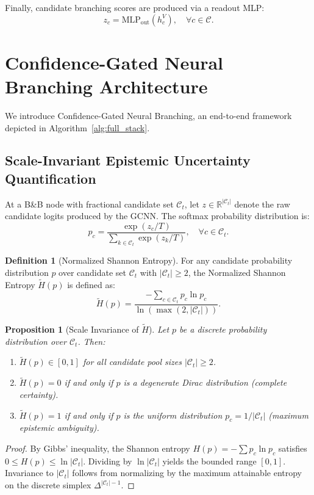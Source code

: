 \documentclass[10pt,twocolumn,letterpaper]{article}
\theoremstyle{plain}
\newtheorem{proposition}[theorem]{Proposition}
\theoremstyle{definition}
\newtheorem{definition}{Definition}
\theoremstyle{remark}
\begin{document}
Finally, candidate branching scores are produced via a readout MLP:
\begin{equation}
    z_c = \text{MLP}_{\text{out}}(h_c^V), \quad \forall c \in \mathcal{C}. \label{eq:gcnn_logits}
\end{equation}

\section{Confidence-Gated Neural Branching Architecture}
\label{sec:architecture}
We introduce Confidence-Gated Neural Branching, an end-to-end framework depicted in Algorithm~\ref{alg:full_stack}.

\subsection{Scale-Invariant Epistemic Uncertainty Quantification}
At a B\&B node with fractional candidate set $\mathcal{C}_t$, let $z \in \mathbb{R}^{|\mathcal{C}_t|}$ denote the raw candidate logits produced by the GCNN. The softmax probability distribution is:
\begin{equation}
    p_c = \frac{\exp(z_c / T)}{\sum_{k \in \mathcal{C}_t} \exp(z_k / T)}, \quad \forall c \in \mathcal{C}_t.
\end{equation}

\begin{definition}[Normalized Shannon Entropy]
For any candidate probability distribution $p$ over candidate set $\mathcal{C}_t$ with $|\mathcal{C}_t| \ge 2$, the Normalized Shannon Entropy $\tilde{H}(p)$ is defined as:
\begin{equation}
    \tilde{H}(p) = \frac{-\sum_{c \in \mathcal{C}_t} p_c \ln p_c}{\ln(\max(2, |\mathcal{C}_t|))}. \label{eq:norm_entropy}
\end{equation}
\end{definition}

\begin{proposition}[Scale Invariance of $\tilde{H}$]
Let $p$ be a discrete probability distribution over $\mathcal{C}_t$. Then:
\begin{enumerate}
    \item $\tilde{H}(p) \in [0, 1]$ for all candidate pool sizes $|\mathcal{C}_t| \ge 2$.
    \item $\tilde{H}(p) = 0$ if and only if $p$ is a degenerate Dirac distribution (complete certainty).
    \item $\tilde{H}(p) = 1$ if and only if $p$ is the uniform distribution $p_c = 1 / |\mathcal{C}_t|$ (maximum epistemic ambiguity).
\end{enumerate}
\end{proposition}
\begin{proof}
By Gibbs' inequality, the Shannon entropy $H(p) = -\sum p_c \ln p_c$ satisfies $0 \le H(p) \le \ln |\mathcal{C}_t|$. Dividing by $\ln |\mathcal{C}_t|$ yields the bounded range $[0, 1]$. Invariance to $|\mathcal{C}_t|$ follows from normalizing by the maximum attainable entropy on the discrete simplex $\Delta^{|\mathcal{C}_t|-1}$.
\end{proof}
\end{document}
